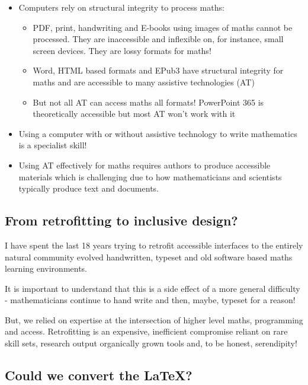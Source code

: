 \documentclass[
  10pt,
  a4paper]{article}
\providecommand{\tightlist}{%
  \setlength{\itemsep}{0pt}\setlength{\parskip}{0pt}}
\begin{document}
\begin{itemize}
\tightlist
\item
  Computers rely on structural integrity to process maths:

  \begin{itemize}
  \tightlist
  \item
    PDF, print, handwriting and E-books using images of maths cannot be processed. They are inaccessible and inflexible on, for instance, small screen devices. They are lossy formats for maths!
  \item
    Word, HTML based formats and EPub3 have structural integrity for maths and are accessible to many assistive technologies (AT)
  \item
    But not all AT can access maths all formats! PowerPoint 365 is theoretically accessible but most AT won't work with it
  \end{itemize}
\item
  Using a computer with or without assistive technology to write mathematics is a specialist skill!
\item
  Using AT effectively for maths requires authors to produce accessible materials which is challenging due to how mathematicians and scientists typically produce text and documents.
\end{itemize}

\hypertarget{from-retrofitting-to-inclusive-design}{%
\subsection{From retrofitting to inclusive design?}\label{from-retrofitting-to-inclusive-design}}

I have spent the last 18 years trying to retrofit accessible interfaces to the entirely natural community evolved handwritten, typeset and old software based maths learning environments.

It is important to understand that this is a side effect of a more general difficulty - mathematicians continue to hand write and then, maybe, typeset for a reason!

But, we relied on expertise at the intersection of higher level maths, programming and access. Retrofitting is an expensive, inefficient compromise reliant on rare skill sets, research output organically grown tools and, to be honest, serendipity!

\hypertarget{could-we-convert-the-latex}{%
\subsection{Could we convert the LaTeX?}\label{could-we-convert-the-latex}}
\end{document}
